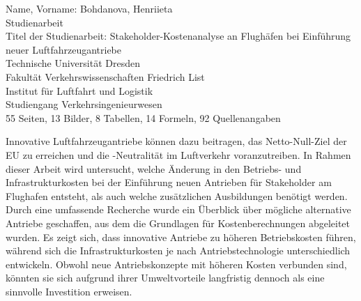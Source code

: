 \newpage
\thispagestyle{empty}
\begin{minipage}[\textheight]{145mm}

\vspace{10mm}

Name, Vorname: Bohdanova, Henriieta\\
Studienarbeit\\

Titel der Studienarbeit: Stakeholder-Kostenanalyse an Flughäfen bei Einführung neuer Luftfahrzeugantriebe\\

Technische Universität Dresden\\
Fakultät Verkehrswissenschaften \glqq Friedrich List\grqq{}\\
Institut für Luftfahrt und Logistik\\

Studiengang Verkehrsingenieurwesen\\
55 Seiten, 13 Bilder, 8 Tabellen, 14 Formeln, 92 Quellenangaben 
		
\vspace{15mm}

\begin{minipage}[\textheight]{145mm}
 
\vspace{10mm}

 
Innovative Luftfahrzeugantriebe können dazu beitragen, das Netto-Null-Ziel der EU zu erreichen und die -Neutralität im Luftverkehr voranzutreiben.
In Rahmen dieser Arbeit wird untersucht, welche Änderung in den Betriebs- und Infrastrukturkosten bei der Einführung neuen Antrieben für Stakeholder am Flughafen entsteht, 
als auch welche zusätzlichen Ausbildungen benötigt werden. Durch eine umfassende Recherche wurde ein Überblick über mögliche alternative Antriebe geschaffen, aus dem die Grundlagen für Kostenberechnungen abgeleitet wurden.
Es zeigt sich, dass innovative Antriebe zu höheren Betriebskosten führen, während sich die Infrastrukturkosten je nach Antriebstechnologie unterschiedlich entwickeln.
Obwohl neue Antriebskonzepte mit höheren Kosten verbunden sind, könnten sie sich aufgrund ihrer Umweltvorteile 
langfristig dennoch als eine sinnvolle Investition erweisen.


 
\end{minipage}\hspace{4cm}



\end{minipage}
\cleardoublepage

